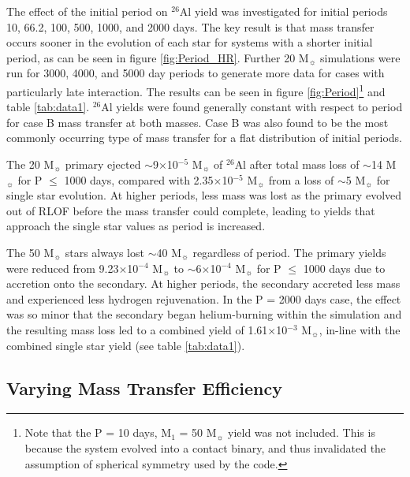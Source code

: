 The effect of the initial period on $^{26}$Al yield was investigated for initial periods 10, 66.2\footnotemark, 100, 500, 1000, and 2000 days.
The key result is that mass transfer occurs sooner in the evolution of each star for systems with a shorter initial period, as can be seen in figure \ref{fig:Period_HR}.
Further 20 M$_{\sun}$ simulations were run for 3000, 4000, and 5000 day periods to generate more data for cases with particularly late interaction.
The results can be seen in figure \ref{fig:Period}\footnote{Note that the P = 10 days, M$_1$ = 50 M$_{\sun}$ yield was not included. This is because the system evolved into a contact binary, and thus invalidated the assumption of spherical symmetry used by the code.} and table \ref{tab:data1}.
$^{26}$Al yields were found generally constant with respect to period for case B mass transfer at both masses. Case B was also found to be the most commonly occurring type of mass transfer for a flat distribution of initial periods.

The 20 M$_{\sun}$ primary ejected $\sim$9$\times$10$^{-5}$ M$_{\sun}$ of $^{26}$Al after total mass loss of $\sim$14 M$_{\sun}$ for P $\leq$ 1000 days, compared with 2.35$\times$10$^{-5}$ M$_{\sun}$ from a loss of $\sim$5 M$_{\sun}$ for single star evolution.
At higher periods, less mass was lost as the primary evolved out of RLOF before the mass transfer could complete, leading to yields that approach the single star values as period is increased.

The 50 M$_{\sun}$ stars always lost $\sim$40 M$_{\sun}$ regardless of period.
The primary yields were reduced from 9.23$\times$10$^{-4}$ M$_{\sun}$ to $\sim$6$\times$10$^{-4}$ M$_{\sun}$ for P $\leq$ 1000 days due to accretion onto the secondary.
At higher periods, the secondary accreted less mass and experienced less hydrogen rejuvenation. In the P = 2000 days case, the effect was so minor that the secondary began helium-burning within the simulation and the resulting mass loss led to a combined yield of 1.61$\times$10$^{-3}$ M$_{\sun}$, in-line with the combined single star yield (see table \ref{tab:data1}).

\subsection{Varying Mass Transfer Efficiency}

